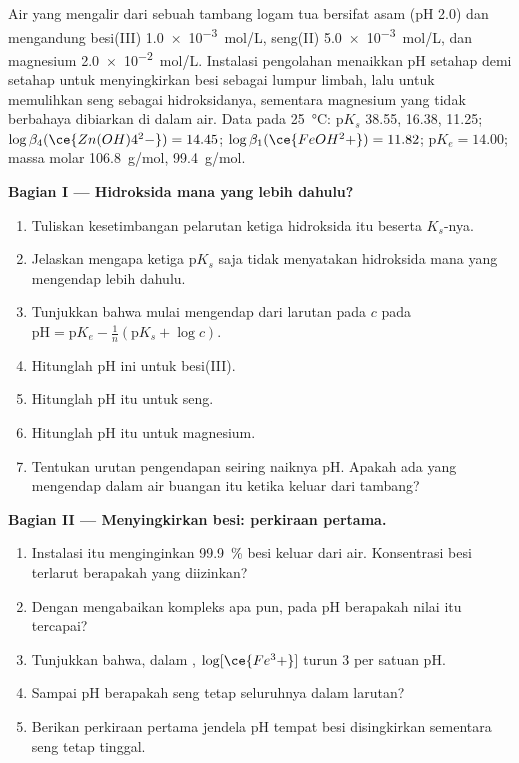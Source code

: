 \begin{problem}
\label{pb:b1:precipitation:1}
Air yang mengalir dari sebuah tambang logam tua bersifat asam (pH 2.0)
dan mengandung besi(III) \qty{1.0e-3}{mol/L}, seng(II) \qty{5.0e-3}{mol/L},
dan magnesium \qty{2.0e-2}{mol/L}. Instalasi pengolahan menaikkan pH
setahap demi setahap untuk menyingkirkan besi sebagai lumpur limbah,
lalu untuk memulihkan seng sebagai hidroksidanya, sementara magnesium
yang tidak berbahaya dibiarkan di dalam air. Data pada
\qty{25}{\celsius}: $\mathrm{p}K_s$  38.55, 
16.38,  11.25; $\log\beta_4(\ce{Zn(OH)4^2-}) = 14.45$;
$\log\beta_1(\ce{FeOH^2+}) = 11.82$; $\mathrm{p}K_e = 14.00$; massa molar
 \qty{106.8}{g/mol},  \qty{99.4}{g/mol}.

\medskip
\noindent\textbf{Bagian I --- Hidroksida mana yang lebih dahulu?}
\begin{enumerate}
  \item Tuliskan kesetimbangan pelarutan ketiga hidroksida itu beserta
        $K_s$-nya.
  \item Jelaskan mengapa ketiga $\mathrm{p}K_s$ saja tidak menyatakan
        hidroksida mana yang mengendap lebih dahulu.
  \item Tunjukkan bahwa  mulai mengendap dari larutan
         pada $c$ pada $\mathrm{pH} = \mathrm{p}K_e -
        \frac1n(\mathrm{p}K_s + \log c)$.
  \item Hitunglah pH ini untuk besi(III).
  \item Hitunglah pH itu untuk seng.
  \item Hitunglah pH itu untuk magnesium.
  \item Tentukan urutan pengendapan seiring naiknya pH. Apakah ada yang
        mengendap dalam air buangan itu ketika keluar dari tambang?
\end{enumerate}

\medskip
\noindent\textbf{Bagian II --- Menyingkirkan besi: perkiraan pertama.}
\begin{enumerate}[resume]
  \item Instalasi itu menginginkan \qty{99.9}{\percent} besi keluar dari
        air. Konsentrasi besi terlarut berapakah yang diizinkan?
  \item Dengan mengabaikan kompleks apa pun, pada pH berapakah nilai itu
        tercapai?
  \item Tunjukkan bahwa, dalam  ,
        $\log[\ce{Fe^3+}]$ turun 3 per satuan pH.
  \item Sampai pH berapakah seng tetap seluruhnya dalam larutan?
  \item Berikan perkiraan pertama jendela pH tempat besi disingkirkan
        sementara seng tetap tinggal.
\end{enumerate}


\end{problem}
